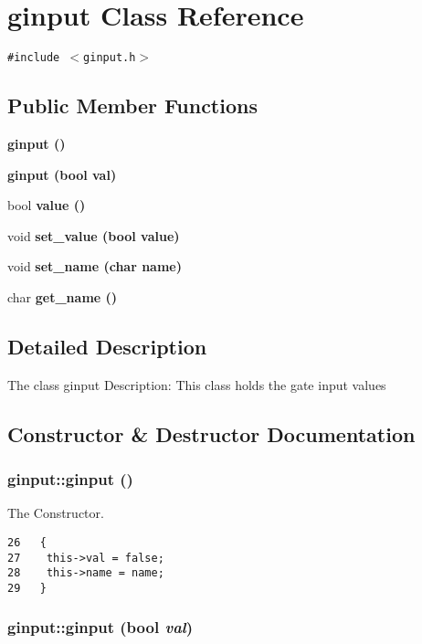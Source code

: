 \section{ginput Class Reference}
\label{classginput}
{\tt \#include $<$ginput.h$>$}

\subsection*{Public Member Functions}
\begin{CompactItemize}
\item 
\bf{ginput} ()
\item 
\bf{ginput} (bool val)
\item 
bool \bf{value} ()
\item 
void \bf{set\_\-value} (bool value)
\item 
void \bf{set\_\-name} (char name)
\item 
char \bf{get\_\-name} ()
\end{CompactItemize}


\subsection{Detailed Description}
The class ginput Description: This class holds the gate input values 



\subsection{Constructor \& Destructor Documentation}
\subsubsection{\setlength{\rightskip}{0pt plus 5cm}ginput::ginput ()\hspace{0.3cm}{\tt  [inline]}}\label{classginput_823d421e04e4eaa3c283bb7830c78494}


The Constructor. 

\begin{Code}\begin{verbatim}26   {
27    this->val = false; 
28    this->name = name;
29   }
\end{verbatim}\end{Code}


\subsubsection{\setlength{\rightskip}{0pt plus 5cm}ginput::ginput (bool {\em val})\hspace{0.3cm}{\tt  [inline]}}\label{classginput_bc88321067aceab75820c47098829073}


